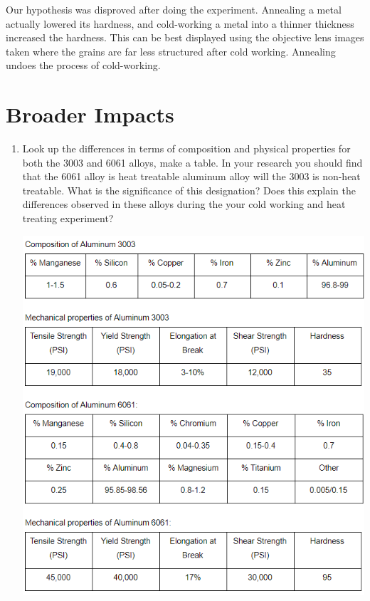 \documentclass{article}
\begin{document}
\indent Our hypothesis was disproved after doing the experiment. Annealing a metal actually lowered its hardness, and cold-working a metal into a thinner thickness increased the hardness. This can be best displayed using the objective lens images taken where the grains are far less structured after cold working. Annealing undoes the process of cold-working.


\section{Broader Impacts}

\begin{enumerate}
\item Look up the differences in terms of composition and physical properties for both the 3003 and 6061 alloys, make a table. In your research you should find that the 6061 alloy is heat treatable aluminum alloy will the 3003 is non-heat treatable. What is the significance of this designation? Does this explain the differences observed in these alloys during the your cold working and heat treating experiment?   

\begin{center}
\includegraphics[width=400pt]{BroaderImpact1.png}
\end{center}


\end{enumerate}
\end{document}
